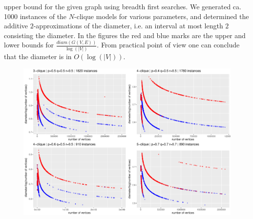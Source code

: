 \documentclass[final]{beamer}
\newlength{\onecolwid}
\newlength{\twocolwid}
\begin{document}
\begin{frame}[t]
\begin{columns}[t]
\begin{column}{\twocolwid}
\begin{columns}[t,totalwidth=\twocolwid]
\begin{column}{\onecolwid}\vspace{-.6in} %
\begin{block}{}\small
upper bound for the given graph using breadth first searches. 
We generated ca. 1000 instances of the $N$-clique models for various parameters, 
and determined the additive $2$-approximations of the diameter, i.e. an interval 
at most length $2$ consisting the diameter. In the figures the 
red and blue marks are the upper and lower bounds for $\frac{diam(G(V,E))}{\log(|V|)}$. 
From practical point of view one can conclude that the diameter is in $O(\log(|V|))$.
\vskip 2cm
\begin{figure}
\includegraphics[width=0.8\linewidth]{./fig/klikkdiam4.pdf}
\end{figure}
\end{block}


  

\end{column}
\end{columns}
\end{column}
\end{columns}
\end{frame}
\end{document}
